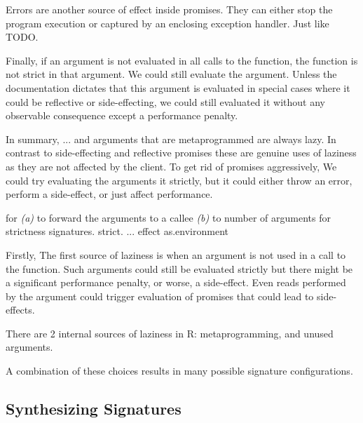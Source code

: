 \documentclass[screen,acmsmall]{acmart}
\begin{document}
Errors are another source of effect inside promises. They can either stop the
program execution or captured by an enclosing exception handler. Just like
TODO.


Finally, if an argument is not evaluated in all calls to the function, the
function is not strict in that argument. We could still evaluate the argument.
Unless the documentation dictates that this argument is evaluated in special
cases where it could be reflective or side-effecting, we could still evaluated
it without any observable consequence except a performance penalty.


In summary, $...$ and arguments that are metaprogrammed are always lazy. In
contrast to side-effecting and reflective promises these are genuine uses of
laziness as they are not affected by the client. To get rid of promises
aggressively, We could try evaluating the arguments it strictly, but it could either throw an
error, perform a side-effect, or just affect performance.







for
\emph{(a)} to forward the arguments to a callee \emph{(b)} to number of
arguments for strictness signatures. strict. ... effect as.environment

Firstly, 
The first source of laziness is when an argument is not
used in a call to the function. Such arguments could still be evaluated strictly
but there might be a significant performance penalty, or worse, a side-effect.
Even reads performed by the argument could trigger evaluation of promises that
could lead to side-effects.

There are 2 internal sources of
laziness in R: metaprogramming, and unused arguments.

A combination of these choices results in many
possible signature configurations.





\subsection{Synthesizing Signatures}
\end{document}

